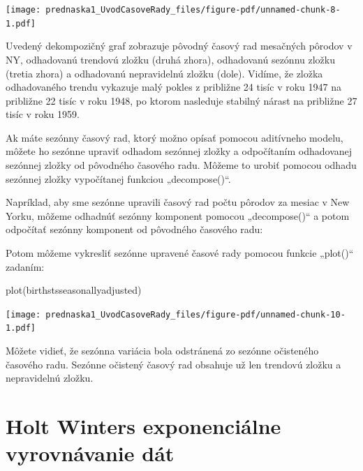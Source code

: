 \documentclass[
  letterpaper,
  DIV=11,
  numbers=noendperiod]{scrreprt}
\newenvironment{Shaded}{\begin{snugshade}}{\end{snugshade}}
\newcommand{\FunctionTok}[1]{\textcolor[rgb]{0.28,0.35,0.67}{#1}}
\newcommand{\NormalTok}[1]{\textcolor[rgb]{0.00,0.23,0.31}{#1}}
\newcommand{\OtherTok}[1]{\textcolor[rgb]{0.00,0.23,0.31}{#1}}
\newcommand{\SpecialCharTok}[1]{\textcolor[rgb]{0.37,0.37,0.37}{#1}}
\begin{document}
\texttt{[image: prednaska1\_UvodCasoveRady\_files/figure-pdf/unnamed-chunk-8-1.pdf]}

Uvedený dekompozičný graf zobrazuje pôvodný časový rad mesačných pôrodov
v NY, odhadovanú trendovú zložku (druhá zhora), odhadovanú sezónnu
zložku (tretia zhora) a odhadovanú nepravidelnú zložku (dole). Vidíme,
že zložka odhadovaného trendu vykazuje malý pokles z približne 24 tisíc
v roku 1947 na približne 22 tisíc v roku 1948, po ktorom nasleduje
stabilný nárast na približne 27 tisíc v roku 1959.

Ak máte sezónny časový rad, ktorý možno opísať pomocou aditívneho
modelu, môžete ho sezónne upraviť odhadom sezónnej zložky a odpočítaním
odhadovanej sezónnej zložky od pôvodného časového radu. Môžeme to urobiť
pomocou odhadu sezónnej zložky vypočítanej funkciou „decompose()``.

Napríklad, aby sme sezónne upravili časový rad počtu pôrodov za mesiac v
New Yorku, môžeme odhadnúť sezónny komponent pomocou „decompose()`` a
potom odpočítať sezónny komponent od pôvodného časového radu:

\begin{Shaded}
\end{Shaded}

Potom môžeme vykresliť sezónne upravené časové rady pomocou funkcie
„plot()`` zadaním:

\begin{Shaded}
\begin{Highlighting}[]
\FunctionTok{plot}\NormalTok{(birthstsseasonallyadjusted)}
\end{Highlighting}
\end{Shaded}

\texttt{[image: prednaska1\_UvodCasoveRady\_files/figure-pdf/unnamed-chunk-10-1.pdf]}

Môžete vidieť, že sezónna variácia bola odstránená zo sezónne očisteného
časového radu. Sezónne očistený časový rad obsahuje už len trendovú
zložku a nepravidelnú zložku.

\part{Holt Winters exponenciálne vyrovnávanie dát}
\end{document}

